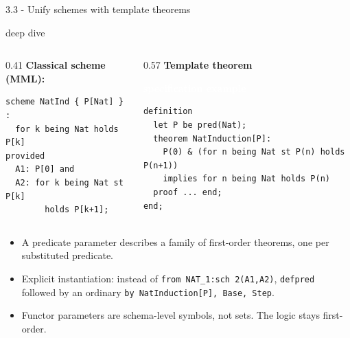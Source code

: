 \documentclass[aspectratio=169,11pt]{beamer}
\newcommand{\statusbadge}[2]{\colorbox{#1}{\textcolor{white}{\strut\scriptsize\sffamily\bfseries #2}}}
\newcommand{\badgeSpec}{\statusbadge{green!35!black}{specification example}}
\newcommand{\deepdivetag}{\hfill\colorbox{black!15}{\textcolor{black!65}{\strut\scriptsize\sffamily deep dive}}}
\begin{document}
\begin{frame}[fragile,t]{3.3 - Unify schemes with template theorems\deepdivetag}
\begin{columns}[T,onlytextwidth]
\begin{column}{0.41\textwidth}
\smallskip
\textbf{Classical scheme (MML):}
\begin{lstlisting}[language={mizar},basicstyle=\ttfamily\footnotesize]
scheme NatInd { P[Nat] } :
  for k being Nat holds P[k]
provided
  A1: P[0] and
  A2: for k being Nat st P[k]
        holds P[k+1];
\end{lstlisting}
\end{column}
\begin{column}{0.57\textwidth}
\smallskip
\textbf{Template theorem}~\badgeSpec
\begin{lstlisting}[language={mizar},basicstyle=\ttfamily\footnotesize]
definition
  let P be pred(Nat);
  theorem NatInduction[P]:
    P(0) & (for n being Nat st P(n) holds P(n+1))
    implies for n being Nat holds P(n)
  proof ... end;
end;
\end{lstlisting}
\end{column}
\end{columns}
\smallskip
\begin{itemize}
\setlength{\itemsep}{1pt}
\setlength{\parsep}{0pt}
\setlength{\parskip}{0pt}
\item A predicate parameter describes a family of first-order theorems, one per substituted predicate.\footnotemark[1]
\item Explicit instantiation: instead of \texttt{from NAT\_1:sch 2(A1,A2)}, \texttt{defpred} followed by an ordinary \texttt{by NatInduction[P], Base, Step}.
\item Functor parameters are schema-level symbols, not sets. The logic stays first-order.
\end{itemize}
\end{frame}
\end{document}
